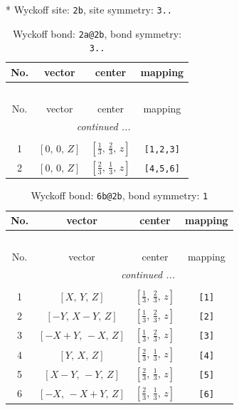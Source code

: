 \documentclass[fleqn,8pt]{jsarticle}
\begin{document}
* Wyckoff site: {\tt 2b}, site symmetry: {\tt 3..}
\renewcommand{\arraystretch}{1.2}
\begin{longtable}{cccc}
\caption{Wyckoff bond: {\tt 2a@2b}, bond symmetry: {\tt 3..}}
 \\
 \hline \hline
No. & vector & center & mapping \\ \hline \endfirsthead

\multicolumn{3}{l}{\tablename\ \thetable{}} \\
 \hline \hline
No. & vector & center & mapping \\ \hline \endhead

 \hline \hline
\multicolumn{3}{r}{\footnotesize\it continued ...} \\ \endfoot

 \hline \hline
\multicolumn{3}{r}{} \\ \endlastfoot

1 & $\left[ 0,\, 0,\, Z \right]$ & $\left[ \frac{1}{3},\, \frac{2}{3},\, z \right]$ & {\tt [1,2,3]} \\ \hline
2 & $\left[ 0,\, 0,\, Z \right]$ & $\left[ \frac{2}{3},\, \frac{1}{3},\, z \right]$ & {\tt [4,5,6]} \\
\end{longtable}
\renewcommand{\arraystretch}{1.2}
\begin{longtable}{cccc}
\caption{Wyckoff bond: {\tt 6b@2b}, bond symmetry: {\tt 1}}
 \\
 \hline \hline
No. & vector & center & mapping \\ \hline \endfirsthead

\multicolumn{3}{l}{\tablename\ \thetable{}} \\
 \hline \hline
No. & vector & center & mapping \\ \hline \endhead

 \hline \hline
\multicolumn{3}{r}{\footnotesize\it continued ...} \\ \endfoot

 \hline \hline
\multicolumn{3}{r}{} \\ \endlastfoot

1 & $\left[ X,\, Y,\, Z \right]$ & $\left[ \frac{1}{3},\, \frac{2}{3},\, z \right]$ & {\tt [1]} \\ \hline
2 & $\left[ - Y,\, X - Y,\, Z \right]$ & $\left[ \frac{1}{3},\, \frac{2}{3},\, z \right]$ & {\tt [2]} \\ \hline
3 & $\left[ - X + Y,\, - X,\, Z \right]$ & $\left[ \frac{1}{3},\, \frac{2}{3},\, z \right]$ & {\tt [3]} \\ \hline
4 & $\left[ Y,\, X,\, Z \right]$ & $\left[ \frac{2}{3},\, \frac{1}{3},\, z \right]$ & {\tt [4]} \\ \hline
5 & $\left[ X - Y,\, - Y,\, Z \right]$ & $\left[ \frac{2}{3},\, \frac{1}{3},\, z \right]$ & {\tt [5]} \\ \hline
6 & $\left[ - X,\, - X + Y,\, Z \right]$ & $\left[ \frac{2}{3},\, \frac{1}{3},\, z \right]$ & {\tt [6]} \\
\end{longtable}
\end{document}
